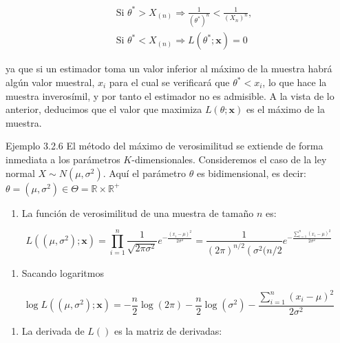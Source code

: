 \documentclass[
]{article}
\providecommand{\tightlist}{%
  \setlength{\itemsep}{0pt}\setlength{\parskip}{0pt}}
\begin{document}
\[
\begin{aligned}
& \text { Si } \theta^{*}>X_{(n)} \Rightarrow \frac{1}{\left(\theta^{*}\right)^{n}}<\frac{1}{\left(X_{n}\right)^{n}}, \\
& \text { Si } \theta^{*}<X_{(n)} \Rightarrow L\left(\theta^{*} ; \mathbf{x}\right)=0
\end{aligned}
\]

ya que si un estimador toma un valor inferior al máximo de la muestra habrá algún valor muestral, \(x_{i}\) para el cual se verificará que \(\theta^{*}<x_{i}\), lo que hace la muestra inverosímil, y por tanto el estimador no es admisible.
A la vista de lo anterior, deducimos que el valor que maximiza \(L(\theta ; \mathbf{x})\) es el máximo de la muestra.

Ejemplo 3.2.6 El método del máximo de verosimilitud se extiende de forma inmediata a los parámetros \(K\)-dimensionales. Consideremos el caso de la
ley normal \(X \sim N\left(\mu, \sigma^{2}\right)\). Aquí el parámetro \(\theta\) es bidimensional, es decir: \(\theta=\left(\mu, \sigma^{2}\right) \in \Theta=\mathbb{R} \times \mathbb{R}^{+}\)

\begin{enumerate}
\def\labelenumi{\arabic{enumi}.}
\tightlist
\item
  La función de verosimilitud de una muestra de tamaño \(n\) es:
\end{enumerate}

\[
L\left(\left(\mu, \sigma^{2}\right) ; \mathbf{x}\right)=\prod_{i=1}^{n} \frac{1}{\sqrt{2 \pi \sigma^{2}}} e^{-\frac{\left(x_{i}-\mu\right)^{2}}{2 \sigma^{2}}}=\frac{1}{(2 \pi)^{n / 2}\left(\sigma^{2}(n / 2\right.} e^{-\frac{\sum_{i=1}^{n}\left(x_{i}-\mu\right)^{2}}{2 \sigma^{2}}}
\]

\begin{enumerate}
\def\labelenumi{\arabic{enumi}.}
\setcounter{enumi}{1}
\tightlist
\item
  Sacando logaritmos
\end{enumerate}

\[
\log L\left(\left(\mu, \sigma^{2}\right) ; \mathbf{x}\right)=-\frac{n}{2} \log (2 \pi)-\frac{n}{2} \log \left(\sigma^{2}\right)-\frac{\sum_{i=1}^{n}\left(x_{i}-\mu\right)^{2}}{2 \sigma^{2}}
\]

\begin{enumerate}
\def\labelenumi{\arabic{enumi}.}
\setcounter{enumi}{2}
\tightlist
\item
  La derivada de \(L()\) es la matriz de derivadas:
\end{enumerate}
\end{document}
